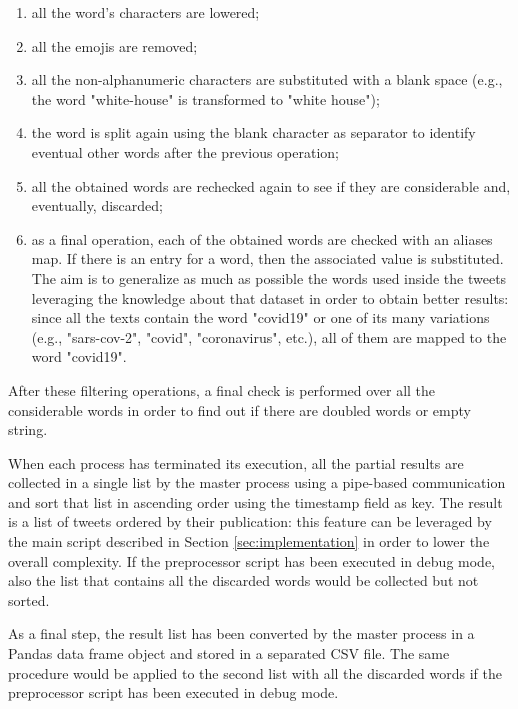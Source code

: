 \begin{description}
	\begin{enumerate}
		\item all the word's characters are lowered;
		\item all the emojis are removed;
		\item all the non-alphanumeric characters are substituted with a blank space (e.g., the word "white-house" is transformed to "white house");
		\item the word is split again using the blank character as separator to identify eventual other words after the previous operation;
		\item all the obtained words are rechecked again to see if they are considerable and, eventually, discarded;
		\item as a final operation, each of the obtained words are checked with an aliases map. If there is an entry for a word, then the associated value is substituted. The aim is to generalize as much as possible the words used inside the tweets leveraging the knowledge about that dataset in order to obtain better results: since all the texts contain the word "covid19" or one of its many variations (e.g., "sars-cov-2", "covid", "coronavirus", etc.), all of them are mapped to the word "covid19".
	\end{enumerate}
	After these filtering operations, a final check is performed over all the considerable words in order to find out if there are doubled words or empty string. 
\end{description}

When each process has terminated its execution, all the partial results are collected in a single list by the master process using a pipe-based communication and sort that list in ascending order using the timestamp field as key. The result is a list of tweets ordered by their publication: this feature can be leveraged by the main script described in Section \ref{sec:implementation} in order to lower the overall complexity. If the preprocessor script has been executed in debug mode, also the list that contains all the discarded words would be collected but not sorted.

As a final step, the result list has been converted by the master process in a Pandas \cite{python-pandas} data frame object and stored in a separated CSV file. The same procedure would be applied to the second list with all the discarded words if the preprocessor script has been executed in debug mode.

